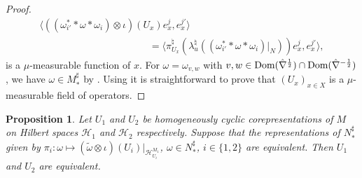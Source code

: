 \documentclass[pdftex]{sigma}
\numberwithin{equation}{section}
\newtheorem{prop}[thm]{Proposition}
\theoremstyle{definition}
\newcommand{\cHil}{\mathcal{H}}
\newcommand{\Dom}{\text{\rm Dom}}
\begin{document}
\begin{proof}
\begin{gather*}
\langle ((\omega_{i'}^\ast \ast \omega \ast \omega_i) \otimes \iota)(U_x) e^j_x, e^{j'}_x \rangle\\
\phantom{\langle (\omega \otimes \iota)(U_x) f^{i,j}_x, f^{i',j'}_x \rangle}{} =
 \langle \pi_{U_x}^\natural(\lambda_u^\natural((\omega_{i'}^\ast \ast \omega \ast \omega_i)\vert_N))  e^j_x, e^{j'}_x \rangle,
\end{gather*}
is a $\mu$-measurable function of $x$. For $\omega = \omega_{v, w}$ with $v,w \in \Dom(\hat{\nabla}^{\frac{1}{2}}) \cap \Dom(\hat{\nabla}^{- \frac{1}{2}} )$, we have $\omega \in M_\ast^\sharp$ by \cite[Proposition~1.10]{Des}. Using \cite[Proposition~II.1.10 and~II.2.1]{DixVNA} it is straightforward to prove that $(U_x)_{x \in X}$ is a $\mu$-measurable f\/ield of operators.
\end{proof}


\begin{prop}\label{PropEqRepCorep}
 Let $U_1$ and $U_2$ be homogeneously cyclic corepresentations of $M$ on Hilbert spaces $\cHil_1$ and $\cHil_2$ respectively. Suppose that the  representations of $N_\ast^\sharp$ given by $\pi_i: \omega \mapsto (\tilde{\omega} \otimes \iota)(U_i)\vert_{\cHil_{U_i}^{M_1}}$, $\omega \in N_\ast^\sharp$, $i \in \{ 1,2\}$ are equivalent. Then $U_1$ and $U_2$ are equivalent.
\end{prop}
\end{document}
